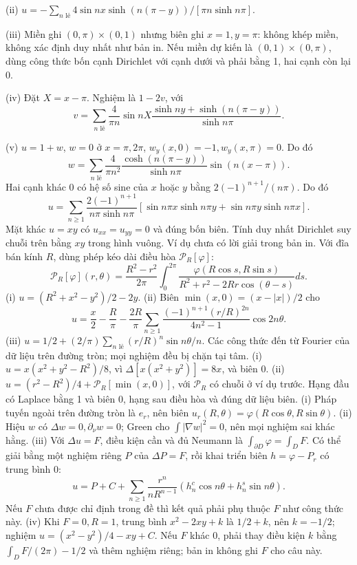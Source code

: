 (ii) $u=-\sum_{n\text{ lẻ}}4\sin nx\sinh(n(\pi-y))/[\pi n\sinh n\pi]$.

(iii) Miền ghi $(0,\pi)\times(0,1)$ nhưng biên ghi $x=1,y=\pi$: không khép miền, không xác định duy nhất như bản in. Nếu miền dự kiến là $(0,1)\times(0,\pi)$, dùng công thức bốn cạnh Dirichlet với cạnh dưới và phải bằng 1, hai cạnh còn lại 0.

(iv) Đặt $X=x-\pi$. Nghiệm là $1-2v$, với
\[v=\sum_{n\text{ lẻ}}\frac4{\pi n}\sin nX\frac{\sinh ny+\sinh(n(\pi-y))}{\sinh n\pi}.\]

(v) $u=1+w$, $w=0$ ở $x=\pi,2\pi$, $w_y(x,0)=-1,w_y(x,\pi)=0$. Do đó
\[w=\sum_{n\text{ lẻ}}\frac4{\pi n^2}\frac{\cosh(n(\pi-y))}{\sinh n\pi}\sin(n(x-\pi)).\]
Hai cạnh khác 0 có hệ số sine của $x$ hoặc $y$ bằng $2(-1)^{n+1}/(n\pi)$. Do đó
\[u=\sum_{n\ge1}\frac{2(-1)^{n+1}}{n\pi\sinh n\pi}[\sin n\pi x\sinh n\pi y+\sin n\pi y\sinh n\pi x].\]
Mặt khác $u=xy$ có $u_{xx}=u_{yy}=0$ và đúng bốn biên. Tính duy nhất Dirichlet suy chuỗi trên bằng $xy$ trong hình vuông.
Ví dụ chưa có lời giải trong bản in. Với đĩa bán kính $R$, dùng phép kéo dài điều hòa $\mathcal P_R[\varphi]$:
\[\mathcal P_R[\varphi](r,\theta)=\frac{R^2-r^2}{2\pi}\int_0^{2\pi}\frac{\varphi(R\cos s,R\sin s)}{R^2+r^2-2Rr\cos(\theta-s)}ds.\]
(i) $u=(R^2+x^2-y^2)/2-2y$.
(ii) Biên $\min(x,0)=(x-|x|)/2$ cho
\[u=\frac x2-\frac R\pi-\frac{2R}\pi\sum_{n\ge1}\frac{(-1)^{n+1}(r/R)^{2n}}{4n^2-1}\cos2n\theta.\]
(iii) $u=1/2+(2/\pi)\sum_{n\text{ lẻ}}(r/R)^n\sin n\theta/n$. Các công thức đến từ Fourier của dữ liệu trên đường tròn; mọi nghiệm đều bị chặn tại tâm.
(i) $u=x(x^2+y^2-R^2)/8$, vì $\Delta[x(x^2+y^2)]=8x$, và biên 0.
(ii) $u=(r^2-R^2)/4+\mathcal P_R[\min(x,0)]$, với $\mathcal P_R$ có chuỗi ở ví dụ trước. Hạng đầu có Laplace bằng 1 và biên 0, hạng sau điều hòa và đúng dữ liệu biên.
(i) Pháp tuyến ngoài trên đường tròn là $e_r$, nên biên $u_r(R,\theta)=\varphi(R\cos\theta,R\sin\theta)$.
(ii) Hiệu $w$ có $\Delta w=0,\partial_\nu w=0$; Green cho $\int|\nabla w|^2=0$, nên mọi nghiệm sai khác hằng.
(iii) Với $\Delta u=F$, điều kiện cần và đủ Neumann là $\int_{\partial D}\varphi=\int_DF$. Có thể giải bằng một nghiệm riêng $P$ của $\Delta P=F$, rồi khai triển biên $h=\varphi-P_r$ có trung bình 0:
\[u=P+C+\sum_{n\ge1}\frac{r^n}{nR^{n-1}}(h_n^c\cos n\theta+h_n^s\sin n\theta).\]
Nếu $F$ chưa được chỉ định trong đề thì kết quả phải phụ thuộc $F$ như công thức này.
(iv) Khi $F=0,R=1$, trung bình $x^2-2xy+k$ là $1/2+k$, nên $k=-1/2$; nghiệm $u=(x^2-y^2)/4-xy+C$. Nếu $F$ khác 0, phải thay điều kiện $k$ bằng $\int_DF/(2\pi)-1/2$ và thêm nghiệm riêng; bản in không ghi $F$ cho câu này.
